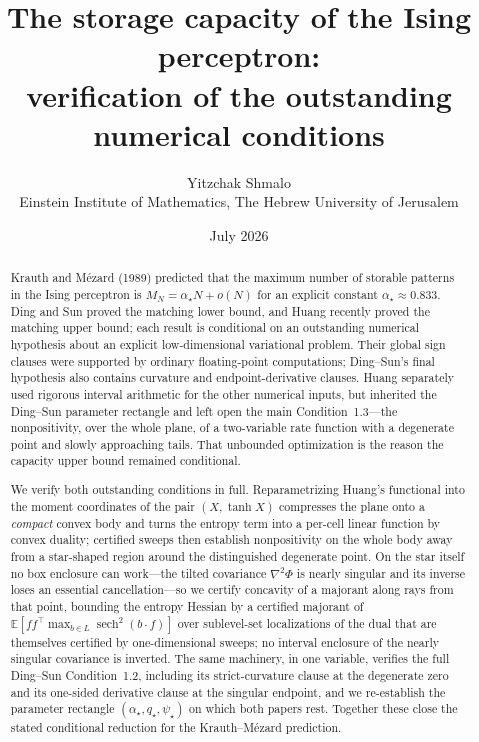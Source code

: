 \documentclass[11pt]{article}
\title{The storage capacity of the Ising perceptron:\\
verification of the outstanding numerical conditions}
\author{Yitzchak Shmalo\\
\small Einstein Institute of Mathematics, The Hebrew University of Jerusalem\\
\small }
\date{July 2026}
\newcommand{\E}{\mathbb{E}}
\begin{document}
\maketitle

\begin{abstract}
Krauth and M\'ezard (1989) predicted that the maximum number of storable
patterns in the Ising perceptron is $M_N=\alpha_\star N + o(N)$ for an
explicit constant $\alpha_\star \approx 0.833$. Ding and Sun proved the matching lower bound,
and Huang recently proved the matching upper bound; each result is
conditional on an outstanding numerical hypothesis about an explicit
low-dimensional variational problem. Their global sign clauses were supported
by ordinary floating-point computations; Ding--Sun's final hypothesis also
contains curvature and endpoint-derivative clauses. Huang separately used
rigorous interval arithmetic for the other numerical inputs, but inherited the Ding--Sun
parameter rectangle and left open the main Condition~1.3---the nonpositivity, over the
whole plane, of a two-variable rate function with a degenerate point and
slowly approaching tails. That
unbounded optimization is the reason the capacity upper bound remained
conditional.

We verify both outstanding conditions in full. Reparametrizing Huang's functional into the
moment coordinates of the pair $(X,\tanh X)$ compresses the plane onto a
\emph{compact} convex body and turns the entropy term into a per-cell linear
function by convex duality; certified sweeps then establish nonpositivity on
the whole body away from a star-shaped region around the distinguished
degenerate point. On the star itself no box enclosure can work---the tilted
covariance $\nabla^2\Phi$ is nearly singular and its inverse loses an
essential cancellation---so we certify concavity of a majorant along rays
from that point, bounding the entropy Hessian by a certified majorant of
$\E[ff^\top\max_{b\in L}\operatorname{sech}^2(b\cdot f)]$ over sublevel-set
localizations of the dual that are themselves certified by one-dimensional
sweeps; no interval enclosure of the nearly singular covariance is inverted.
The same machinery, in one variable,
verifies the full Ding--Sun Condition~1.2, including its strict-curvature
clause at the degenerate zero and its one-sided derivative clause at the
singular endpoint, and we
re-establish the parameter rectangle
$(\alpha_\star, q_\star, \psi_\star)$ on which both papers rest. Together
these close the stated conditional reduction for the Krauth--M\'ezard prediction.
\end{abstract}
\end{document}
